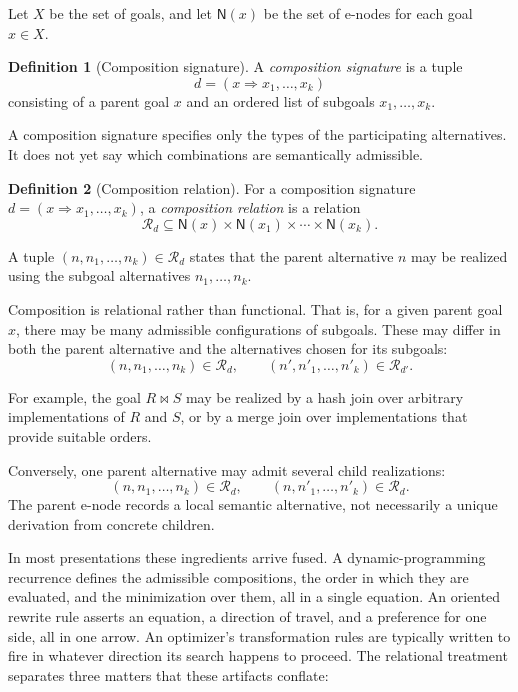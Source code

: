 \documentclass[sigconf,nonacm]{acmart}
\theoremstyle{definition}
\newtheorem{definition}{Definition}[section]
\theoremstyle{plain}
\theoremstyle{remark}
\begin{document}
Let \(X\) be the set of goals, and let \(\mathsf{N}(x)\) be the set of
e-nodes for each goal \(x \in X\).

\begin{definition}[Composition signature]
A \emph{composition signature} is a tuple
\[
d=(x \Rightarrow x_1,\ldots,x_k)
\]
consisting of a parent goal \(x\) and an ordered list of subgoals
\(x_1,\ldots,x_k\).
\end{definition}

A composition signature specifies only the types of the participating
alternatives.  It does not yet say which combinations are semantically
admissible.

\begin{definition}[Composition relation]
For a composition signature \(d=(x \Rightarrow x_1,\ldots,x_k)\),
a \emph{composition relation} is a relation
\[
\mathcal{R}_d
\subseteq
\mathsf{N}(x)
\times
\mathsf{N}(x_1)
\times\cdots\times
\mathsf{N}(x_k).
\]

A tuple \((n,n_1,\ldots,n_k)\in\mathcal{R}_d\) states that the
parent alternative \(n\) may be realized using the subgoal
alternatives \(n_1,\ldots,n_k\).
\end{definition}

Composition is relational rather than functional. That is,
for a given parent goal \(x\), there may be many admissible
configurations of subgoals.  These may differ in both the parent
alternative and the alternatives chosen for its subgoals:
\[
(n,n_1,\ldots,n_k)\in\mathcal{R}_d,
\qquad
(n',n'_1,\ldots,n'_k)\in\mathcal{R}_{d'}.
\]

For example, the goal \(R\Join S\) may be realized by a hash join over
arbitrary implementations of \(R\) and \(S\), or by a merge join over
implementations that provide suitable orders.

Conversely, one parent alternative may admit several child
realizations:
\[
(n,n_1,\ldots,n_k) \in \mathcal{R}_d,
\qquad
(n,n'_1,\ldots,n'_k) \in \mathcal{R}_d.
\]
The parent e-node records a local semantic alternative, not necessarily
a unique derivation from concrete children.

In most presentations these ingredients arrive fused.  A
dynamic-programming recurrence defines the admissible compositions,
the order in which they are evaluated, and the minimization over
them, all in a single equation.  An oriented rewrite rule asserts an
equation, a direction of travel, and a preference for one side, all
in one arrow.  An optimizer's transformation rules are typically
written to fire in whatever direction its search happens to proceed.
The relational treatment separates three matters that these
artifacts conflate:
\end{document}

